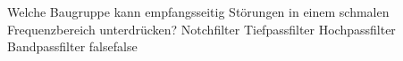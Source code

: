     {Welche Baugruppe kann empfangsseitig Störungen in einem schmalen Frequenzbereich unterdrücken?}
    {Notchfilter}
    {Tiefpassfilter}
    {Hochpassfilter}
    {Bandpassfilter}
    {false}{false}